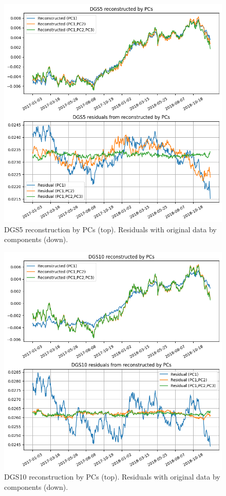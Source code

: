 \begin{figure}[hp]
	\centering
	\includegraphics[width=0.7\linewidth]{figures/dgs5_reco}
	\caption{DGS5 reconstruction by PCs (top). Residuals with original data by components (down).}
	\label{fig:pca_dsg5}
\end{figure}

\begin{figure}[hp]
	\centering
	\includegraphics[width=0.7\linewidth]{figures/dgs10_reco}
	\caption{DGS10 reconstruction by PCs (top). Residuals with original data by components (down).}
	\label{fig:pca_dsg10}
\end{figure}

